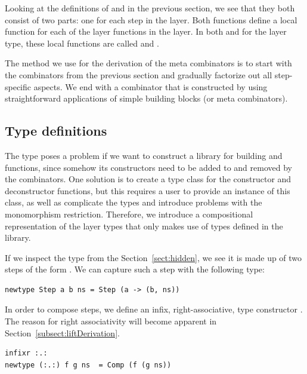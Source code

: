 \documentclass[preprint,natbib]{sigplanconf}
\begin{document}
Looking at the definitions of  and  in the previous section, we see that they both consist of two parts: one for each step in the layer. Both functions define a local function for each of the layer functions in the layer. In both  and  for the  layer type, these local functions are called  and . 

The method we use for the derivation of the meta combinators is to start with the combinators from the previous section and gradually factorize out all step-specific aspects. We end with a combinator that is constructed by using straightforward applications of simple building blocks (or meta combinators). 



 
%																
\subsection{Type definitions} \label{subsecttypedef}

The  type poses a problem if we want to construct a library for building  and  functions, since somehow its constructors need to be added to and removed by the combinators. One solution is to create a type class for the constructor and deconstructor functions, but this requires a user to provide an instance of this class, as well as complicate the types and introduce problems with the monomorphism restriction. Therefore, we introduce a compositional representation of the layer types that only makes use of types defined in the library.

If we inspect the  type from the Section~\ref{sect:hidden}, we see it is made up of two steps of the form . We can capture such a step with the following type:

\begin{small}
\begin{verbatim}
newtype Step a b ns = Step (a -> (b, ns))
\end{verbatim}
\end{small}

In order to compose steps, we define an infix, right-associative, type constructor .
The reason for right associativity will become apparent in Section~\ref{subsect:liftDerivation}.

\begin{small}
\begin{verbatim}
infixr :.:
newtype (:.:) f g ns  = Comp (f (g ns))
\end{verbatim}
\end{small}
\end{document}

